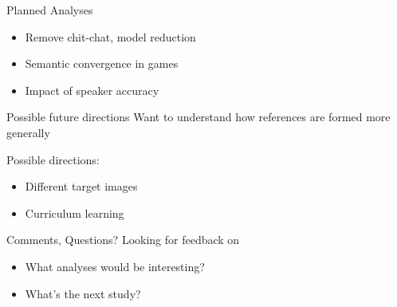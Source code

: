 \documentclass[ 12pt, xcolor=beamer,table,usenames,dvipsnames, ignorenonframetext, ngerman]{beamer}
\begin{document}
\begin{frame}{Planned Analyses}
	\begin{itemize}
		\item Remove chit-chat, model reduction
		\item Semantic convergence in games
		\item Impact of speaker accuracy
	\end{itemize}
\end{frame}


\begin{frame}{Possible future directions}
	Want to understand how references are formed more generally \pause
	
	Possible directions:
\begin{itemize}
	\item Different target images
	\item Curriculum learning
\end{itemize}

\end{frame}

\begin{frame}{Comments, Questions?}
	Looking for feedback on
	\smallskip
	\begin{itemize}
	\item What analyses would be interesting?
	\item What's the next study?
	\end{itemize}
\end{frame}

\appendix
\end{document}
